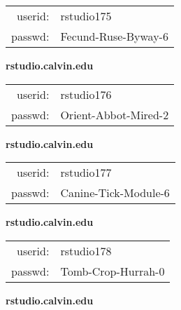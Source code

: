 \documentclass{article}\usepackage[]{graphicx}\usepackage[]{color}
\begin{document}
\begin{multicols}{3}
\begin{minipage}{.3\textwidth}
\begin{tabular}{rl}
userid: & rstudio175\\
passwd: & Fecund-Ruse-Byway-6

\vspace{5mm}

\end{tabular}\end{minipage}

\vspace{5mm}

\begin{minipage}{.3\textwidth}
\centerline{\textbf{rstudio.calvin.edu}}
\medskip
\begin{tabular}{rl}

userid: & rstudio176\\
passwd: & Orient-Abbot-Mired-2

\vspace{5mm}

\end{tabular}\end{minipage}

\vspace{5mm}

\begin{minipage}{.3\textwidth}
\centerline{\textbf{rstudio.calvin.edu}}
\medskip
\begin{tabular}{rl}

userid: & rstudio177\\
passwd: & Canine-Tick-Module-6

\vspace{5mm}

\end{tabular}\end{minipage}

\vspace{5mm}

\begin{minipage}{.3\textwidth}
\centerline{\textbf{rstudio.calvin.edu}}
\medskip
\begin{tabular}{rl}

userid: & rstudio178\\
passwd: & Tomb-Crop-Hurrah-0

\vspace{5mm}

\end{tabular}\end{minipage}

\vspace{5mm}

\begin{minipage}{.3\textwidth}
\centerline{\textbf{rstudio.calvin.edu}}
\medskip
\begin{tabular}{rl}


\end{tabular}
\end{minipage}
\end{multicols}
\end{document}
